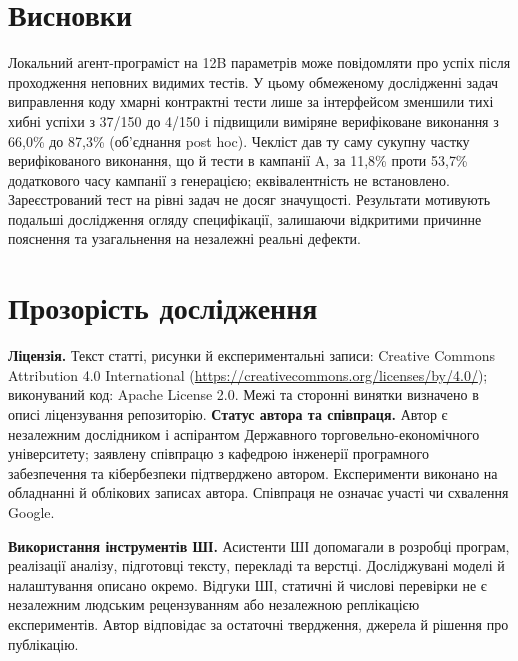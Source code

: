 \documentclass[11pt]{article}
\begin{document}
\section{Висновки}\label{sec:conclusion}
Локальний агент-програміст на 12B параметрів може повідомляти про успіх після проходження неповних видимих тестів. У цьому обмеженому дослідженні задач виправлення коду хмарні контрактні тести лише за інтерфейсом зменшили тихі хибні успіхи з 37/150 до 4/150 і підвищили виміряне верифіковане виконання з 66{,}0\% до 87{,}3\% (об’єднання post hoc). Чекліст дав ту саму сукупну частку верифікованого виконання, що й тести в кампанії A, за 11{,}8\% проти 53{,}7\% додаткового часу кампанії з генерацією; еквівалентність не встановлено. Зареєстрований тест на рівні задач не досяг значущості. Результати мотивують подальші дослідження огляду специфікації, залишаючи відкритими причинне пояснення та узагальнення на незалежні реальні дефекти.

\section*{Прозорість дослідження}
\textbf{Ліцензія.} Текст статті, рисунки й експериментальні записи: Creative Commons Attribution 4.0 International (\url{https://creativecommons.org/licenses/by/4.0/}); виконуваний код: Apache License 2.0. Межі та сторонні винятки визначено в описі ліцензування репозиторію.
\textbf{Статус автора та співпраця.} Автор є незалежним дослідником і аспірантом Державного торговельно-економічного університету; заявлену співпрацю з кафедрою інженерії програмного забезпечення та кібербезпеки підтверджено автором. Експерименти виконано на обладнанні й облікових записах автора. Співпраця не означає участі чи схвалення Google.

\textbf{Використання інструментів ШІ.} Асистенти ШІ допомагали в розробці програм, реалізації аналізу, підготовці тексту, перекладі та верстці. Досліджувані моделі й налаштування описано окремо. Відгуки ШІ, статичні й числові перевірки не є незалежним людським рецензуванням або незалежною реплікацією експериментів. Автор відповідає за остаточні твердження, джерела й рішення про публікацію.




\appendix
\end{document}
